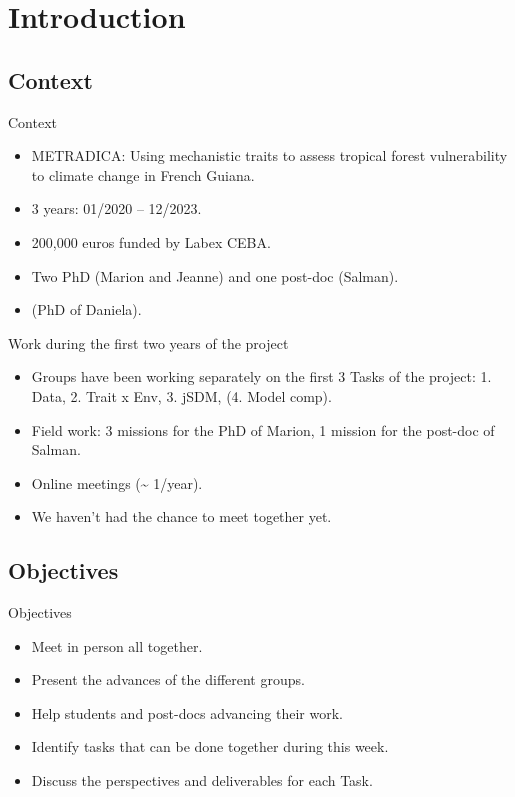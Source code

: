 \documentclass[10pt,table,dvipsnames,compress]{beamer}
\begin{document}
\section{Introduction}
\label{sec:org2358968}

\subsection{Context}
\label{sec:org657aaac}

\begin{frame}[label={sec:orgcb2e860}]{Context}
\begin{itemize}
\item \alert{METRADICA}: Using mechanistic traits to assess tropical forest vulnerability to climate change in French Guiana.
\item 3 years: 01/2020 -- 12/2023.
\item 200,000 euros funded by Labex CEBA.
\item Two PhD (Marion and Jeanne) and one post-doc (Salman).
\item (PhD of Daniela).
\end{itemize}
\end{frame}

\begin{frame}[label={sec:org1ae356f}]{Work during the first two years of the project}
\begin{itemize}
\item Groups have been working separately on the first 3 Tasks of the project: \newline \alert{1.} Data, \alert{2.} Trait x Env, \alert{3.} jSDM, (\alert{4.} Model comp).
\item Field work: 3 missions for the PhD of Marion, 1 mission for the post-doc of Salman.
\item Online meetings (\textasciitilde{} 1/year).
\item We haven't had the chance to meet together yet.
\end{itemize}
\end{frame}

\subsection{Objectives}
\label{sec:orgc485fa3}

\begin{frame}[label={sec:org8ec6813}]{Objectives}
\begin{itemize}
\item Meet in person all together.
\item Present the advances of the different groups.
\item Help students and post-docs advancing their work.
\item Identify tasks that can be done together during this week.
\item Discuss the perspectives and deliverables for each Task.
\end{itemize}
\end{frame}
\end{document}
